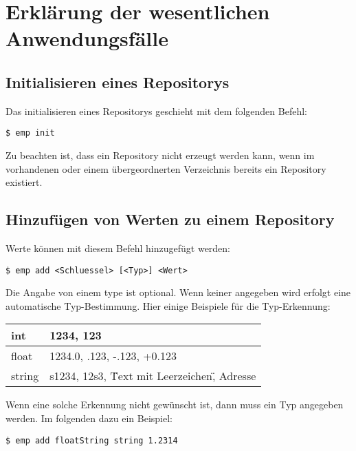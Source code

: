 
\section{Erklärung der wesentlichen Anwendungsfälle}

\subsection{Initialisieren eines Repositorys}
Das initialisieren eines Repositorys geschieht mit dem folgenden Befehl:
\begin{lstlisting}[style=Bash]
$ emp init
\end{lstlisting}
Zu beachten ist, dass ein Repository nicht erzeugt werden kann, wenn im vorhandenen oder einem übergeordnerten Verzeichnis bereits ein Repository existiert.

\subsection{Hinzufügen von Werten zu einem Repository}
Werte können mit diesem Befehl hinzugefügt werden:
\begin{lstlisting}[style=Bash]
$ emp add <Schluessel> [<Typ>] <Wert>
\end{lstlisting}
Die Angabe von einem type ist optional. Wenn keiner angegeben wird erfolgt eine automatische Typ-Bestimmung.
Hier einige Beispiele für die Typ-Erkennung:

\begin{tabular}{| l | l |}
	\hline
	int & 1234, 123 \\
	\hline
	float & 1234.0, .123, -.123, +0.123 \\
	\hline
	string & s1234, 12s3, \"Text mit Leerzeichen\", Adresse \\
	\hline
\end{tabular} 

Wenn eine solche Erkennung nicht gewünscht ist, dann muss ein Typ angegeben werden. Im folgenden dazu ein Beispiel:
\begin{lstlisting}[style=Bash]
$ emp add floatString string 1.2314
\end{lstlisting}

\subsection{Löschen von bereits hinzugefügten Werten}
Das Löschen von in einem Repository enthaltenen Werten erfolgt mit dem Befehl remove:
\begin{lstlisting}[style=Bash]
$ emp remove [Optionen] <Schluessel>
\end{lstlisting}

